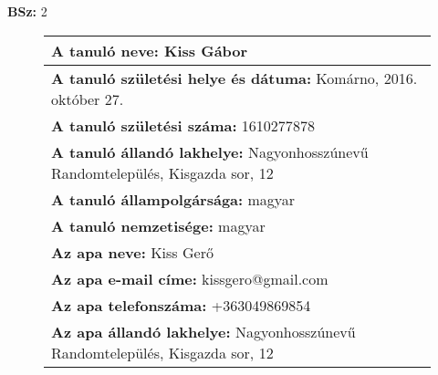 \documentclass[10pt,a4paper]{article}
\begin{document}
    \vfill
    \textbf{BSz: }2
\newpage
    \begin{figure}[!ht]
    \begin{tabular}{|m{\textwidth}|}
    \hline \vspace{3pt}
    \textbf{A tanuló neve:} \hspace{0.5cm} Kiss Gábor \vspace{3pt} \\
\hline\vspace{3pt}
\textbf{A tanuló születési helye és dátuma:} \hspace{0.5cm} Komárno, 2016.  október 27. \vspace{3pt} \\
\hline\vspace{3pt}
\textbf{A tanuló születési száma:} \hspace{0.5cm} 1610277878 \vspace{3pt} \\
\hline\vspace{3pt}
\textbf{A tanuló állandó lakhelye:} \hspace{0.5cm} Nagyonhosszúnevű Randomtelepülés, Kisgazda sor, 12 \vspace{3pt} \\
\hline\vspace{3pt}
\textbf{A tanuló állampolgársága:} \hspace{0.5cm} magyar \vspace{3pt} \\
\hline\vspace{3pt}
\textbf{A tanuló nemzetisége:} \hspace{0.5cm} magyar \vspace{3pt} \\
\hline\vspace{3pt}
\textbf{Az apa neve:} \hspace{0.5cm} Kiss Gerő \vspace{3pt} \\
\hline\vspace{3pt}
\textbf{Az apa e-mail címe:} \hspace{0.5cm} kissgero@gmail.com \vspace{3pt} \\
\hline\vspace{3pt}
\textbf{Az apa telefonszáma:} \hspace{0.5cm} +363049869854 \vspace{3pt} \\
\hline\vspace{3pt}
\textbf{Az apa állandó lakhelye:} \hspace{0.5cm} Nagyonhosszúnevű Randomtelepülés, Kisgazda sor, 12 \vspace{3pt} \\

\end{tabular}
\end{figure}
\end{document}
